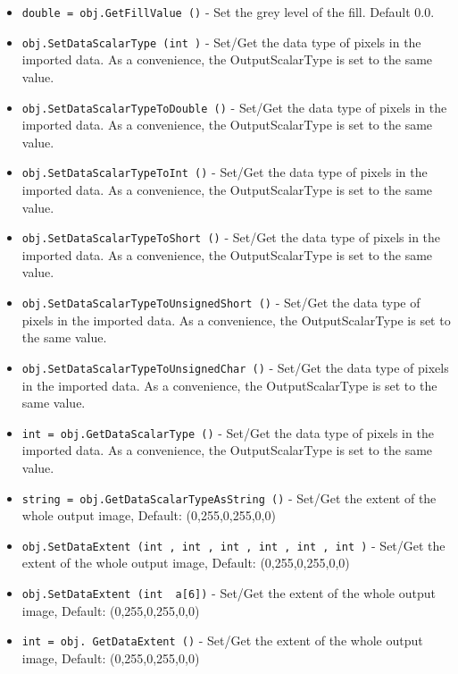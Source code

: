 \begin{itemize}
\item  \verb|double = obj.GetFillValue ()| -  Set the grey level of the fill. Default 0.0.

\item  \verb|obj.SetDataScalarType (int )| -  Set/Get the data type of pixels in the imported data.
 As a convenience, the OutputScalarType is set to the same value.

\item  \verb|obj.SetDataScalarTypeToDouble ()| -  Set/Get the data type of pixels in the imported data.
 As a convenience, the OutputScalarType is set to the same value.

\item  \verb|obj.SetDataScalarTypeToInt ()| -  Set/Get the data type of pixels in the imported data.
 As a convenience, the OutputScalarType is set to the same value.

\item  \verb|obj.SetDataScalarTypeToShort ()| -  Set/Get the data type of pixels in the imported data.
 As a convenience, the OutputScalarType is set to the same value.

\item  \verb|obj.SetDataScalarTypeToUnsignedShort ()| -  Set/Get the data type of pixels in the imported data.
 As a convenience, the OutputScalarType is set to the same value.

\item  \verb|obj.SetDataScalarTypeToUnsignedChar ()| -  Set/Get the data type of pixels in the imported data.
 As a convenience, the OutputScalarType is set to the same value.

\item  \verb|int = obj.GetDataScalarType ()| -  Set/Get the data type of pixels in the imported data.
 As a convenience, the OutputScalarType is set to the same value.

\item  \verb|string = obj.GetDataScalarTypeAsString ()| -  Set/Get the extent of the whole output image,
 Default: (0,255,0,255,0,0)

\item  \verb|obj.SetDataExtent (int , int , int , int , int , int )| -  Set/Get the extent of the whole output image,
 Default: (0,255,0,255,0,0)

\item  \verb|obj.SetDataExtent (int  a[6])| -  Set/Get the extent of the whole output image,
 Default: (0,255,0,255,0,0)

\item  \verb|int = obj. GetDataExtent ()| -  Set/Get the extent of the whole output image,
 Default: (0,255,0,255,0,0)


\end{itemize}
